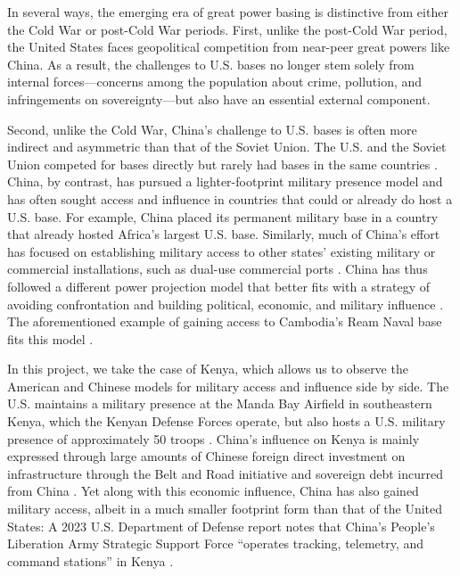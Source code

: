 In several ways, the emerging era of great power basing is distinctive from either the Cold War or post-Cold War periods. First, unlike the post-Cold War period, the United States faces geopolitical competition from near-peer great powers like China. As a result, the challenges to U.S. bases no longer stem solely from internal forces—concerns among the population about crime, pollution, and infringements on sovereignty—but also have an essential external component\cite{allen2023}.

Second, unlike the Cold War, China's challenge to U.S. bases is often more indirect and asymmetric than that of the Soviet Union. The U.S. and the Soviet Union competed for bases directly but rarely had bases in the same countries \cite{Nieman2020}. China, by contrast, has pursued a lighter-footprint military presence model and has often sought access and influence in countries that could or already do host a U.S. base. For example, China placed its permanent military base in a country that already hosted Africa's largest U.S. base. Similarly, much of China's effort has focused on establishing military access to other states' existing military or commercial installations, such as dual-use commercial ports \cite{kardon2022}. China has thus followed a different power projection model that better fits with a strategy of avoiding confrontation and building political, economic, and military influence \cite{Doshi2021}. The aforementioned example of gaining access to Cambodia's Ream Naval base fits this model \cite{gan2023}.


In this project, we take the case of Kenya, which allows us to observe the American and Chinese models for military access and influence side by side. The U.S. maintains a military presence at the Manda Bay Airfield in southeastern Kenya, which the Kenyan Defense Forces operate, but also hosts a U.S. military presence of approximately 50 troops \cite{allen2022}. China's influence on Kenya is mainly expressed through large amounts of Chinese foreign direct investment on infrastructure through the Belt and Road initiative and sovereign debt incurred from China \cite{lesutis2021}. Yet along with this economic influence, China has also gained military access, albeit in a much smaller footprint form than that of the United States: A 2023 U.S. Department of Defense report notes that China's People's Liberation Army Strategic Support Force ``operates tracking, telemetry, and command stations'' in Kenya \cite{DOD2023}. 

